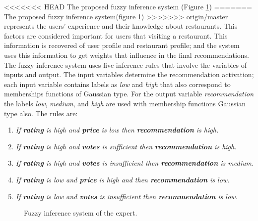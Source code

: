 <<<<<<< HEAD
The proposed fuzzy inference system (Figure  \ref{fig:expertfis})
=======
The proposed fuzzy inference system(figure \ref{fig:expertfis})
>>>>>>> origin/master
represents the users' experience and their knowledge about restaurants.
This factors are considered important for users that visiting a
restaurant. This information is recovered of user profile and
restaurant profile; and the system uses this information to get
weights that influence in the final recommendations. The fuzzy
inference system uses five inference rules that involve the variables of
inputs and output. The input variables determine the recommendation
activation; each input variable contains labels as \textit{low} and
\textit{high} that also correspond to memberships functions of
Gaussian type. For the output variable \textit{recommendation} the
labels \textit{low}, \textit{medium}, and \textit{high} are used with
membership functions Gaussian type also. The rules are:
\begin{enumerate} 
\item \textit{If \textbf{rating} is high and \textbf{price} is low then 
\textbf{recommendation} is high.}
\item \textit{If \textbf{rating} is high and \textbf{votes} is sufficient then 
\textbf{recommendation} is high.}
\item \textit{If \textbf{rating} is high and \textbf{votes} is insufficient then 
\textbf{recommendation} is medium.}
\item \textit{If \textbf{rating} is low and \textbf{price} is high and then 
\textbf{recommendation} is low.} 
\item \textit{If \textbf{rating} is low and \textbf{votes} is insufficient then 
\textbf{recommendation} is low.}
\end{enumerate} 
\begin{figure}
\captionsetup{justification=centering,margin=2cm,font=footnotesize}
\centering
{}
\caption{Fuzzy inference system of the expert.}
\label{fig:expertfis}      
\end{figure}

